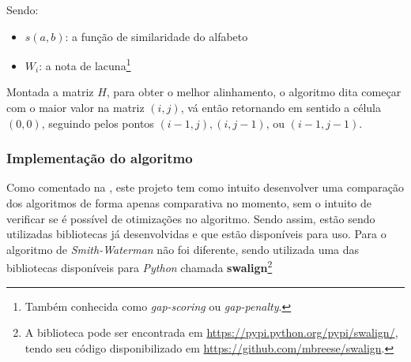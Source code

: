 Sendo:
\begin{itemize}
	\item $s(a,b)$: a função de similaridade do alfabeto
	\item $W_i$: a nota de lacuna\footnote{Também conhecida como \textit{gap-scoring} ou \textit{gap-penalty}.}
\end{itemize}

Montada a matriz $H$, para obter o melhor alinhamento, o algoritmo dita começar com o maior valor na matriz $(i,j)$, vá então retornando em sentido a célula $(0,0)$, seguindo pelos pontos $(i - 1,j), (i, j - 1)$, ou $(i - 1, j - 1)$.

\subsubsection{Implementação do algoritmo} %
\label{sub:implementa_o_do_algoritmo}

Como comentado na , este projeto tem como intuito desenvolver uma comparação dos algoritmos de forma apenas comparativa no momento, sem o intuito de verificar se é possível de otimizações no algoritmo. Sendo assim, estão sendo utilizadas bibliotecas já desenvolvidas e que estão  disponíveis para uso. Para o algoritmo de \textit{Smith-Waterman} não foi diferente, sendo utilizada uma das bibliotecas disponíveis para \textit{Python} chamada \textbf{swalign}\footnote{A biblioteca pode ser encontrada em \url{https://pypi.python.org/pypi/swalign/}, tendo seu código disponibilizado em \url{https://github.com/mbreese/swalign}.}


